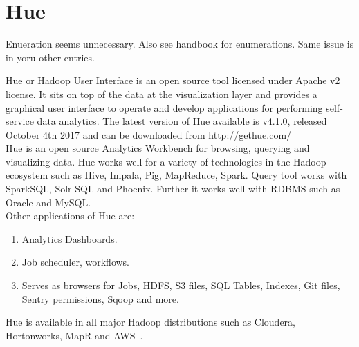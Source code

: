 \section{Hue}

\begin{NOTE}
Enueration seems unnecessary. Also see handbook for enumerations. Same
issue is in yoru other entries.
\end{NOTE}

Hue or Hadoop User Interface is an open source tool licensed 
under Apache v2 license. It sits on top of the data at the 
visualization layer and provides a graphical user interface to 
operate and develop applications for performing self-service 
data analytics.
The latest version of Hue available is v4.1.0, released October 
4th 2017 and can be downloaded from http://gethue.com/
~\cite{hid-sp18-517-hue-apache} \\

Hue is an open source Analytics Workbench for browsing, querying 
and visualizing data.
Hue works well for a variety of technologies in the Hadoop 
ecosystem such as Hive, Impala, Pig, MapReduce, Spark. Query 
tool works with SparkSQL, Solr SQL and Phoenix. Further it works 
well with RDBMS such as Oracle and MySQL. \\

Other applications of Hue are: \\

\begin{enumerate}
\item Analytics Dashboards. \\
\item Job scheduler, workflows. \\
\item Serves as browsers for Jobs, HDFS, S3 files, SQL Tables, Indexes, 
Git files, Sentry permissions, Sqoop and more. \\
\end{enumerate}

Hue is available in all major Hadoop distributions such as Cloudera, 
Hortonworks, MapR and AWS~\cite{hid-sp18-517-Hue-wiki}.


